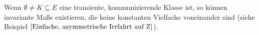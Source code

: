 Wenn $\emptyset \neq K \subseteq E$ eine transiente, kommunizierende Klasse ist, so können invariante Maße existieren, die keine konstanten Vielfache voneinander sind (siehe Beispiel $\ref{Einfache, asymmetrische Irrfahrt auf Z}$).